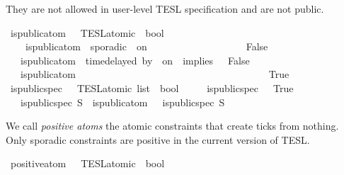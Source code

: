 \begin{isabellebody}
\begin{isamarkuptext}
  They are not allowed in user-level TESL specification and are not public.%
\end{isamarkuptext}\isamarkuptrue%
\isamarkupfalse%
\ is{\isacharunderscore}public{\isacharunderscore}atom\ {\isacharcolon}{\isacharcolon}\ {\isacartoucheopen}{\isacharprime}{\isasymtau}\ TESL{\isacharunderscore}atomic\ {\isasymRightarrow}\ bool{\isacartoucheclose}\ \isanewline
\ \ \ \ {\isacartoucheopen}is{\isacharunderscore}public{\isacharunderscore}atom\ {\isacharparenleft}{\isacharunderscore}\ sporadic{\isasymsharp}\ {\isacharunderscore}\ on\ {\isacharunderscore}{\isacharparenright}\ \ \ \ \ \ \ \ \ \ \ \ \ \ \ \ \ \ {\isacharequal}\ False{\isacartoucheclose}\isanewline
\ \ {\isacharbar}\ {\isacartoucheopen}is{\isacharunderscore}public{\isacharunderscore}atom\ {\isacharparenleft}{\isacharunderscore}\ time{\isacharminus}delayed{\isasymsharp}\ by\ {\isacharunderscore}\ on\ {\isacharunderscore}\ implies\ {\isacharunderscore}{\isacharparenright}\ {\isacharequal}\ False{\isacartoucheclose}\isanewline
\ \ {\isacharbar}\ {\isacartoucheopen}is{\isacharunderscore}public{\isacharunderscore}atom\ {\isacharunderscore}\ \ \ \ \ \ \ \ \ \ \ \ \ \ \ \ \ \ \ \ \ \ \ \ \ \ \ \ \ \ \ \ \ \ \ \ \ {\isacharequal}\ True{\isacartoucheclose}\isanewline
\isanewline
{}\isamarkupfalse%
\ is{\isacharunderscore}public{\isacharunderscore}spec\ {\isacharcolon}{\isacharcolon}\ {\isacartoucheopen}{\isacharprime}{\isasymtau}\ TESL{\isacharunderscore}atomic\ list\ {\isasymRightarrow}\ bool{\isacartoucheclose}\ \isanewline
\ \ \ \ {\isacartoucheopen}is{\isacharunderscore}public{\isacharunderscore}spec\ {\isacharbrackleft}{\isacharbrackright}\ {\isacharequal}\ True{\isacartoucheclose}\isanewline
\ \ {\isacharbar}\ {\isacartoucheopen}is{\isacharunderscore}public{\isacharunderscore}spec\ {\isacharparenleft}{\isasymphi}{\isacharhash}S{\isacharparenright}\ {\isacharequal}\ {\isacharparenleft}{\isacharparenleft}is{\isacharunderscore}public{\isacharunderscore}atom\ {\isasymphi}{\isacharparenright}\ {\isasymand}\ {\isacharparenleft}is{\isacharunderscore}public{\isacharunderscore}spec\ S{\isacharparenright}{\isacharparenright}{\isacartoucheclose}%
\begin{isamarkuptext}%
We call \emph{positive atoms} the atomic constraints that create ticks from nothing.
  Only sporadic constraints are positive in the current version of TESL.%
\end{isamarkuptext}\isamarkuptrue%
\isamarkupfalse%
\ positive{\isacharunderscore}atom\ {\isacharcolon}{\isacharcolon}\ {\isacartoucheopen}{\isacharprime}{\isasymtau}\ TESL{\isacharunderscore}atomic\ {\isasymRightarrow}\ bool{\isacartoucheclose}\ \isanewline

\end{isabellebody}
